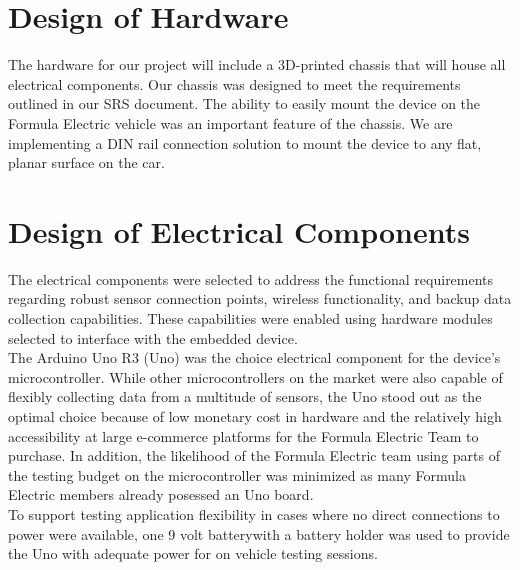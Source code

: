 \documentclass[12pt, titlepage]{article}
\begin{document}
\section{Design of Hardware}

The hardware for our project will include a 3D-printed chassis that will house all electrical components. Our chassis was designed to meet the requirements outlined in our SRS document. The ability to easily mount the device on the Formula Electric vehicle was an important feature of the chassis. We are implementing a DIN rail connection solution to mount the device to any flat, planar surface on the car.


\newpage
\section{Design of Electrical Components}


The electrical components were selected to address the functional requirements regarding robust sensor connection points, wireless functionality, and backup data collection capabilities. These capabilities were enabled using hardware modules selected to interface with the embedded device. \\

The Arduino Uno R3 (Uno) was the choice electrical component for the device's microcontroller. While other microcontrollers on the market were also capable of flexibly collecting data from a multitude of sensors, the Uno stood out as the optimal choice because of low monetary cost in hardware and the relatively high accessibility at large e-commerce platforms for the Formula Electric Team to purchase. In addition, the likelihood of the Formula Electric team using parts of the testing budget on the microcontroller was minimized as many Formula Electric members already posessed an Uno board. \\
To support testing application flexibility in cases where no direct connections to power were available, one 9 volt batterywith a battery holder was used to provide the Uno with adequate power for on vehicle testing sessions. \\
\end{document}

